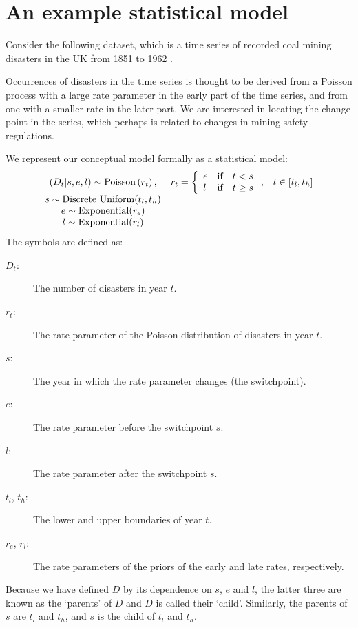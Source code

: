 
\section{An example statistical model}
Consider the following dataset, which is a time series of recorded coal mining disasters in the UK from 1851 to 1962 \citep{Jarrett:1979fr}.
\begin{center}
\end{center}
Occurrences of disasters in the time series is thought to be derived from a Poisson process with a large rate parameter in the early part of the time series, and from one with a smaller rate in the later part. We are interested in locating the change point in the series, which perhaps is related to changes in mining safety regulations.

We represent our conceptual model formally as a statistical model:
\begin{equation}
    \begin{array}{ccc}
        (D_t | s, e, l) \sim \textup{Poisson}\left(r_t\right), & r_t=\left\{\begin{array}{lll}
            e &\textup{if}& t< s\\ l &\textup{if}& t\ge s
            \end{array}\right.,&t\in[t_l,t_h]\\
        s\sim \textup{Discrete Uniform}(t_l, t_h)\\
        e\sim \textup{Exponential}(r_e)\\
        l\sim \textup{Exponential}(r_l)
    \end{array}
    \label{disastermodel}
\end{equation}
The symbols are defined as:
\begin{description}
    \item[$D_t$:] The number of disasters in year $t$.
    \item[$r_t$:] The rate parameter of the Poisson distribution of disasters in year $t$.
    \item[$s$:] The year in which the rate parameter changes (the switchpoint).
    \item[$e$:] The rate parameter before the switchpoint $s$.
    \item[$l$:] The rate parameter after the switchpoint $s$.
    \item[$t_l$, $t_h$:] The lower and upper boundaries of year $t$.
    \item[$r_e$, $r_l$:] The rate parameters of the priors of the early and late rates, respectively.
\end{description}
Because we have defined $D$ by its dependence on $s$, $e$ and $l$, the latter three are known as the `parents' of $D$ and $D$ is called their `child'. Similarly, the parents of $s$ are $t_l$ and $t_h$, and $s$ is the child of $t_l$ and $t_h$.

